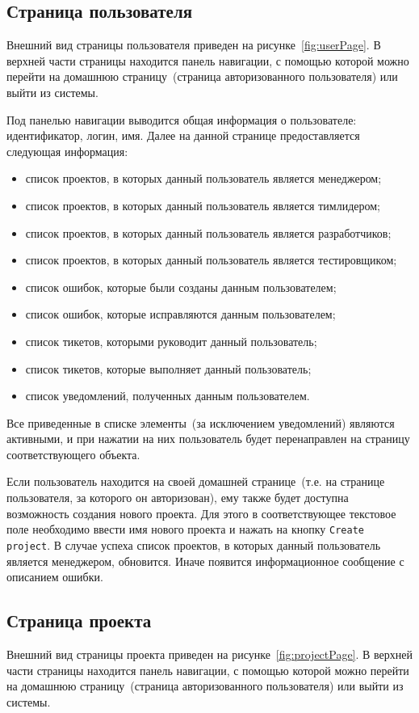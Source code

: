 \subsection{Страница пользователя}
Внешний вид страницы пользователя приведен на рисунке~\ref{fig:userPage}. В верхней части страницы находится панель навигации, с помощью которой можно перейти на домашнюю страницу~(страница авторизованного пользователя) или выйти из системы. 

Под панелью навигации выводится общая информация о пользователе: идентификатор, логин, имя. Далее на данной странице предоставляется следующая информация:
\begin{itemize}
\item список проектов, в которых данный пользователь является менеджером;
\item список проектов, в которых данный пользователь является тимлидером;
\item список проектов, в которых данный пользователь является разработчиков;
\item список проектов, в которых данный пользователь является тестировщиком;
\item список ошибок, которые были созданы данным пользователем;
\item список ошибок, которые исправляются данным пользователем;
\item список тикетов, которыми руководит данный пользователь;
\item список тикетов, которые выполняет данный пользователь;
\item список уведомлений, полученных данным пользователем.
\end{itemize}

Все приведенные в списке элементы~(за исключением уведомлений) являются активными, и при нажатии на них пользователь будет перенаправлен на страницу соответствующего объекта.

Если пользователь находится на своей домашней странице~(т.е. на странице пользователя, за которого он авторизован), ему также будет доступна возможность создания нового проекта. Для этого в соответствующее текстовое поле необходимо ввести имя нового проекта и нажать на кнопку \texttt{Create project}. В случае успеха список проектов, в которых данный пользователь является менеджером, обновится. Иначе появится информационное сообщение с описанием ошибки.

\subsection{Страница проекта}
Внешний вид страницы проекта приведен на рисунке~\ref{fig:projectPage}. В верхней части страницы находится панель навигации, с помощью которой можно перейти на домашнюю страницу~(страница авторизованного пользователя) или выйти из системы. 

